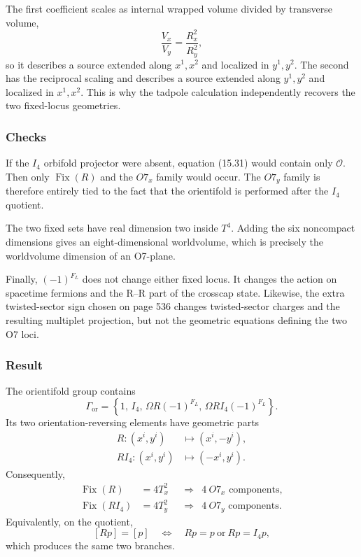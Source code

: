 \documentclass[
  10pt,
  a4paper,
  openany]{book}
\begin{document}
The first coefficient scales as internal wrapped volume divided by
transverse volume, \[
\frac{V_x}{V_y}
=
\frac{R_x^2}{R_y^2},
\] so it describes a source extended along \(x^1,x^2\) and localized in
\(y^1,y^2\). The second has the reciprocal scaling and describes a
source extended along \(y^1,y^2\) and localized in \(x^1,x^2\). This is
why the tadpole calculation independently recovers the two fixed-locus
geometries.

\subsubsection{Checks}\label{checks-21}

If the \(I_4\) orbifold projector were absent, equation (15.31) would
contain only \(\mathcal O\). Then only \(\operatorname{Fix}(R)\) and the
\(O7_x\) family would occur. The \(O7_y\) family is therefore entirely
tied to the fact that the orientifold is performed after the \(I_4\)
quotient.

The two fixed sets have real dimension two inside \(T^4\). Adding the
six noncompact dimensions gives an eight-dimensional worldvolume, which
is precisely the worldvolume dimension of an O7-plane.

Finally, \((-1)^{F_L}\) does not change either fixed locus. It changes
the action on spacetime fermions and the R--R part of the crosscap
state. Likewise, the extra twisted-sector sign chosen on page 536
changes twisted-sector charges and the resulting multiplet projection,
but not the geometric equations defining the two O7 loci.

\subsubsection{Result}\label{result-25}

The orientifold group contains \[
\boxed{
\Gamma_{\mathrm{or}}
=
\left\{
1,\,
I_4,\,
\Omega R(-1)^{F_L},\,
\Omega RI_4(-1)^{F_L}
\right\}.
}
\] Its two orientation-reversing elements have geometric parts \[
\begin{aligned}
R:(x^i,y^i)&\mapsto(x^i,-y^i),\\
RI_4:(x^i,y^i)&\mapsto(-x^i,y^i).
\end{aligned}
\] Consequently, \[
\boxed{
\begin{aligned}
\operatorname{Fix}(R)
&=
4T_x^2
&&\Longrightarrow&
4\ O7_x\text{ components},\\
\operatorname{Fix}(RI_4)
&=
4T_y^2
&&\Longrightarrow&
4\ O7_y\text{ components}.
\end{aligned}
}
\] Equivalently, on the quotient, \[
\boxed{
[Rp]=[p]
\quad\Longleftrightarrow\quad
Rp=p
\ \text{or}\
Rp=I_4p,
}
\] which produces the same two branches.
\end{document}
